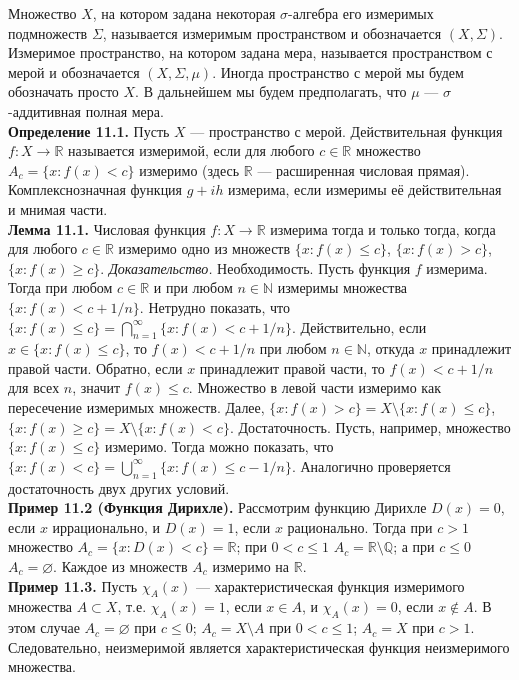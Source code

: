 \documentclass[12pt]{article}
\begin{document}
Множество $X$, на котором задана некоторая $\sigma$-алгебра его измеримых подмножеств $\Sigma$, называется измеримым пространством и обозначается $(X,\Sigma)$. Измеримое пространство, на котором задана мера, называется пространством с мерой и обозначается $(X,\Sigma,\mu)$. Иногда пространство с мерой мы будем обозначать просто $X$. В дальнейшем мы будем предполагать, что $\mu$ — $\sigma$-аддитивная полная мера. \\\textbf{Определение 11.1.} Пусть $X$ — пространство с мерой. Действительная функция $f:X\to\mathbb{R}$ называется измеримой, если для любого $c\in\mathbb{R}$ множество $A_c=\{x:f(x)<c\}$ измеримо (здесь $\mathbb{R}$ — расширенная числовая прямая). Комплекснозначная функция $g+ih$ измерима, если измеримы её действительная и мнимая части. \\\textbf{Лемма 11.1.} Числовая функция $f:X\to\mathbb{R}$ измерима тогда и только тогда, когда для любого $c\in\mathbb{R}$ измеримо одно из множеств $\{x:f(x)\leq c\}$, $\{x:f(x)>c\}$, $\{x:f(x)\geq c\}$. \textit{Доказательство.} Необходимость. Пусть функция $f$ измерима. Тогда при любом $c\in\mathbb{R}$ и при любом $n\in\mathbb{N}$ измеримы множества $\{x:f(x)<c+1/n\}$. Нетрудно показать, что $\{x:f(x)\leq c\}=\bigcap_{n=1}^\infty\{x:f(x)<c+1/n\}$. Действительно, если $x\in\{x:f(x)\leq c\}$, то $f(x)<c+1/n$ при любом $n\in\mathbb{N}$, откуда $x$ принадлежит правой части. Обратно, если $x$ принадлежит правой части, то $f(x)<c+1/n$ для всех $n$, значит $f(x)\leq c$. Множество в левой части измеримо как пересечение измеримых множеств. Далее, $\{x:f(x)>c\}=X\setminus\{x:f(x)\leq c\}$, $\{x:f(x)\geq c\}=X\setminus\{x:f(x)<c\}$. Достаточность. Пусть, например, множество $\{x:f(x)\leq c\}$ измеримо. Тогда можно показать, что $\{x:f(x)<c\}=\bigcup_{n=1}^\infty\{x:f(x)\leq c-1/n\}$. Аналогично проверяется достаточность двух других условий. \\\textbf{Пример 11.2 (Функция Дирихле).} Рассмотрим функцию Дирихле $D(x)=0$, если $x$ иррационально, и $D(x)=1$, если $x$ рационально. Тогда при $c>1$ множество $A_c=\{x:D(x)<c\}=\mathbb{R}$; при $0<c\leq 1$ $A_c=\mathbb{R}\setminus\mathbb{Q}$; а при $c\leq 0$ $A_c=\varnothing$. Каждое из множеств $A_c$ измеримо на $\mathbb{R}$. \\\textbf{Пример 11.3.} Пусть $\chi_A(x)$ — характеристическая функция измеримого множества $A\subset X$, т.е. $\chi_A(x)=1$, если $x\in A$, и $\chi_A(x)=0$, если $x\notin A$. В этом случае $A_c=\varnothing$ при $c\leq 0$; $A_c=X\setminus A$ при $0<c\leq 1$; $A_c=X$ при $c>1$. Следовательно, неизмеримой является характеристическая функция неизмеримого множества.
\end{document}
